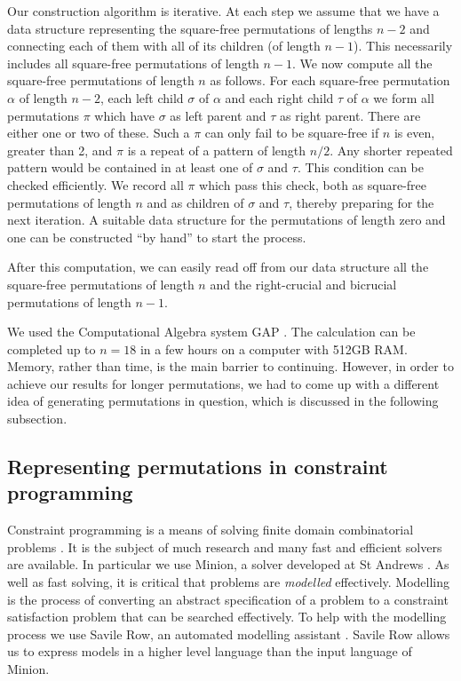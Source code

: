 \documentclass[12pt,reqno]{article}
\begin{document}
Our construction algorithm is iterative. At each step we assume that we have a data structure representing the square-free permutations of lengths $n-2$ and connecting each of them with all of its children (of length $n-1$). This necessarily includes all square-free permutations of length $n-1$. We now compute all the square-free permutations of length $n$ as follows. For each square-free permutation $\alpha$ of length $n-2$, each left child $\sigma$ of $\alpha$ and each right child $\tau$ of $\alpha$ we form all permutations $\pi$ which have $\sigma$ as left parent and $\tau$ as right parent. There are either one or two of these. Such a $\pi$ can only fail to be square-free if $n$ is even, greater than 2, and $\pi$ is a repeat of a pattern of length $n/2$. Any shorter repeated pattern would be contained in at least one of $\sigma$ and $\tau$. This condition can be checked efficiently. We record all $\pi$ which pass this check, both as square-free permutations of length $n$ and as children of $\sigma$ and $\tau$, thereby preparing for the next iteration. A suitable data structure for the permutations of length zero and one can be constructed ``by hand'' to start the process.

After this computation, we can easily read off from our data structure all the square-free permutations of length $n$ and the right-crucial and bicrucial permutations of length $n-1$.   

We used the Computational Algebra system GAP \cite{GAP4}.  The calculation can be completed up to $n=18$ in a few hours on a computer with 512GB RAM.  Memory, rather than time, is the main barrier to continuing. However, in order to achieve our results for longer permutations, we had to come up with a different idea of generating permutations in question, which is discussed in the following subsection.


\subsection{Representing permutations in constraint programming}\label{encoding-orderings}
\label{sec:cp}

Constraint programming is a means of solving finite domain combinatorial problems
\cite{handbook-cp}.  
It is the subject of much research and many fast and efficient solvers are available. In particular we use Minion, a solver developed at St Andrews \cite{minion}.   As well as fast solving, it is critical that problems are \emph{modelled} effectively.  
Modelling is the process of converting an abstract specification of a problem to a constraint satisfaction problem that 
can be searched effectively.   To help with the modelling process we use Savile Row, an automated modelling assistant
\cite{savilerow}.  Savile Row allows us to express models in a higher level language than the input language of Minion.
\end{document}
